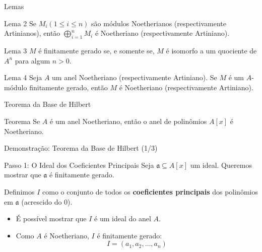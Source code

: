 \documentclass[aspectratio=169]{beamer}
\begin{document}
\begin{frame}{Lemas}
	\begin{block}{Lema 2}
		Se $M_{i} (1\leq i\leq n)$ são módulos Noetherianos (respectivamente Artinianos), então $\bigoplus_{i=1}^{n}M_{i}$ é Noetheriano (respectivamente Artiniano).
	\end{block}

	\pause

	\begin{block}{Lema 3}
		$M$ é finitamente gerado se, e somente se, $M$ é isomorfo a um quociente de $A^{n}$ para algum $n>0$.
	\end{block}

	\pause

	\begin{block}{Lema 4}
		Seja $A$ um anel Noetheriano (respectivamente Artiniano). Se $M$ é um $A$-módulo finitamente gerado, então $M$ é Noetheriano (respectivamente Artiniano).
	\end{block}


\end{frame}


\begin{frame}{Teorema da Base de Hilbert}
	\begin{block}{Teorema}
		Se $A$ é um anel Noetheriano, então o anel de polinômios $A[x]$ é Noetheriano.
	\end{block}
\end{frame}

\begin{frame}{Demonstração: Teorema da Base de Hilbert (1/3)}
	\begin{block}{Passo 1: O Ideal dos Coeficientes Principais}
		Seja $\mathfrak{a} \subseteq A[x]$ um ideal. Queremos mostrar que $\mathfrak{a}$ é finitamente gerado.

		\pause
		\vspace{0.3cm}
		Definimos $I$ como o conjunto de todos os \textbf{coeficientes principais} dos polinômios em $\mathfrak{a}$ (acrescido do $0$).

		\pause
		\vspace{0.3cm}
		\begin{itemize}
			\item É possível mostrar que $I$ é um ideal do anel $A$.
			\item Como $A$ é Noetheriano, $I$ é finitamente gerado:
			      $$I = (a_1, a_2, \dots, a_n)$$
		\end{itemize}
	\end{block}
\end{frame}
\end{document}
